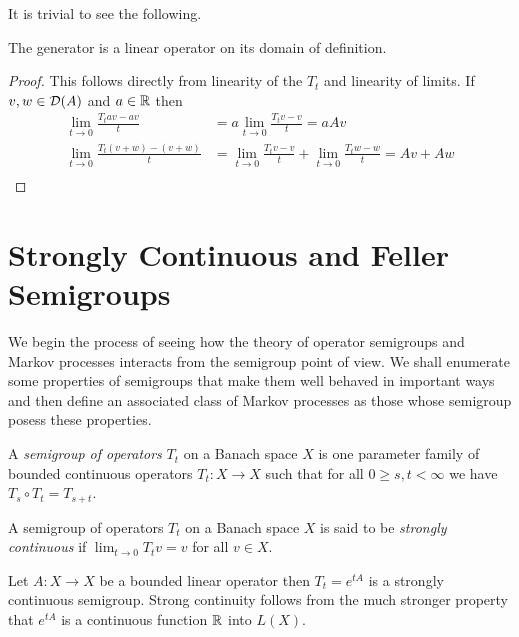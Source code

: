 It is trivial to see the following.
\begin{prop}The generator is a linear operator on its domain of definition.
\end{prop}
\begin{proof}
This follows directly from linearity of the $T_t$ and linearity of limits.  If $v,w \in \mathcal{D}(A)$ and $a \in \mathbb{R}$ then
\begin{align*}
\lim_{t \to 0} \frac{T_t av - av}{t} &= a \lim_{t \to 0} \frac{T_t v - v}{t} = aAv \\
\lim_{t \to 0} \frac{T_t (v+w) - (v+w)}{t} &= \lim_{t \to 0} \frac{T_t v - v}{t} + \lim_{t \to 0} \frac{T_t w - w}{t}= Av + Aw \\
\end{align*}
\end{proof}

\section{Strongly Continuous and Feller Semigroups}

We begin the process of seeing how the theory of operator semigroups and Markov processes interacts from the semigroup point of view.  We shall enumerate some properties of
semigroups that make them well behaved in important ways and then define an associated class of Markov processes  as those whose semigroup posess these properties.  

\begin{defn}A \emph{semigroup of operators} $T_t$ on a Banach space $X$ is one parameter family of bounded continuous operators $T_t : X \to X$ such that
for all $0 \geq s,t < \infty$ we have $T_s \circ T_t = T_{s+t}$.
\end{defn}

\begin{defn}A semigroup of operators $T_t$ on a Banach space $X$ is said to be \emph{strongly continuous} if $\lim_{t \to 0} T_tv = v$ for all $v \in X$.
\end{defn}

\begin{examp}\label{ExponentialOfBoundedStronglyContinuousSemigroup}Let $A : X \to X$ be a bounded linear operator then $T_t = e^{tA}$ is a strongly continuous semigroup.  Strong continuity follows from the much stronger property that
$e^{tA}$ is a continuous function $\mathbb{R}$ into $L(X)$.
\end{examp}

